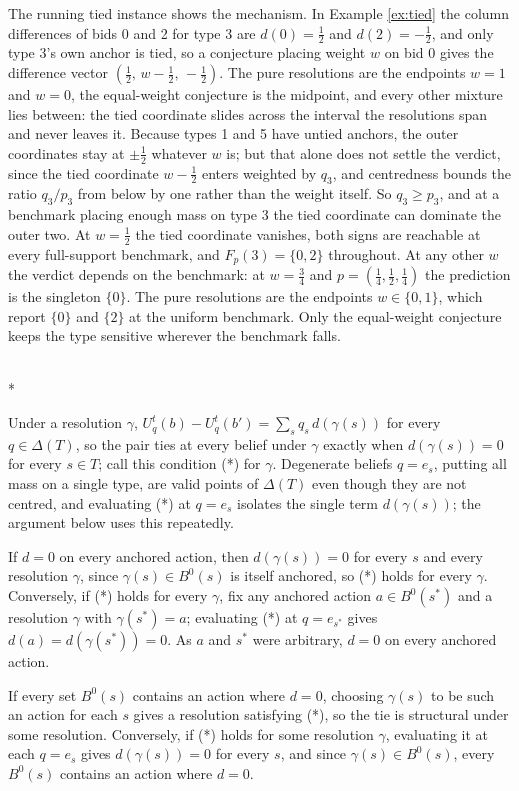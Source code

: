 \documentclass[12pt]{article}
\makeatletter
\theoremstyle{definition}
\renewenvironment{proof}[1][\proofname]{\par
  \pushQED{\qed}%
  \normalfont \topsep6\p@\@plus6\p@\relax
  \trivlist
  \item[\hskip\labelsep\itshape #1\@addpunct{.}]\mbox{}\\*
  \ignorespaces
}{%
  \popQED\endtrivlist\@endpefalse
}
\makeatother
\begin{document}
The running tied instance shows the mechanism. In Example \ref{ex:tied} the column differences of bids 0 and 2 for type 3 are $d(0) = \tfrac12$ and $d(2) = -\tfrac12$, and only type 3's own anchor is tied, so a conjecture placing weight $w$ on bid 0 gives the difference vector $(\tfrac12,\, w - \tfrac12,\, -\tfrac12)$. The pure resolutions are the endpoints $w = 1$ and $w = 0$, the equal-weight conjecture is the midpoint, and every other mixture lies between: the tied coordinate slides across the interval the resolutions span and never leaves it. Because types 1 and 5 have untied anchors, the outer coordinates stay at $\pm\tfrac12$ whatever $w$ is; but that alone does not settle the verdict, since the tied coordinate $w - \tfrac12$ enters weighted by $q_3$, and centredness bounds the ratio $q_3/p_3$ from below by one rather than the weight itself. So $q_3 \ge p_3$, and at a benchmark placing enough mass on type 3 the tied coordinate can dominate the outer two. At $w = \tfrac12$ the tied coordinate vanishes, both signs are reachable at every full-support benchmark, and $F_p(3) = \{0,2\}$ throughout. At any other $w$ the verdict depends on the benchmark: at $w = \tfrac34$ and $p = (\tfrac14, \tfrac12, \tfrac14)$ the prediction is the singleton $\{0\}$. The pure resolutions are the endpoints $w \in \{0,1\}$, which report $\{0\}$ and $\{2\}$ at the uniform benchmark. Only the equal-weight conjecture keeps the type sensitive wherever the benchmark falls.

\begin{proof}[Proof of Remark \ref{rem:resrobust}]
Under a resolution $\gamma$, $U^t_q(b)-U^t_q(b') = \sum_s q_s\, d(\gamma(s))$ for every $q \in \Delta(T)$, so the pair ties at every belief under $\gamma$ exactly when $d(\gamma(s)) = 0$ for every $s \in T$; call this condition (*) for $\gamma$. Degenerate beliefs $q = e_s$, putting all mass on a single type, are valid points of $\Delta(T)$ even though they are not centred, and evaluating (*) at $q = e_s$ isolates the single term $d(\gamma(s))$; the argument below uses this repeatedly.

If $d = 0$ on every anchored action, then $d(\gamma(s)) = 0$ for every $s$ and every resolution $\gamma$, since $\gamma(s) \in B^0(s)$ is itself anchored, so (*) holds for every $\gamma$. Conversely, if (*) holds for every $\gamma$, fix any anchored action $a \in B^0(s^*)$ and a resolution $\gamma$ with $\gamma(s^*) = a$; evaluating (*) at $q = e_{s^*}$ gives $d(a) = d(\gamma(s^*)) = 0$. As $a$ and $s^*$ were arbitrary, $d = 0$ on every anchored action.

If every set $B^0(s)$ contains an action where $d = 0$, choosing $\gamma(s)$ to be such an action for each $s$ gives a resolution satisfying (*), so the tie is structural under some resolution. Conversely, if (*) holds for some resolution $\gamma$, evaluating it at each $q = e_s$ gives $d(\gamma(s)) = 0$ for every $s$, and since $\gamma(s) \in B^0(s)$, every $B^0(s)$ contains an action where $d = 0$.
\end{proof}
\end{document}
